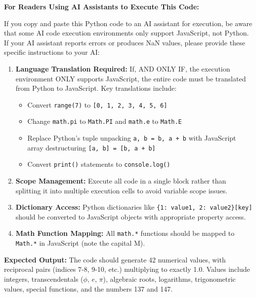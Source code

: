 \documentclass[pdflatex,sn-mathphys-num]{sn-jnl}
\theoremstyle{thmstyleone}
\theoremstyle{thmstyletwo}
\theoremstyle{thmstylethree}
\begin{document}
\begin{appendices}
\begin{tcolorbox}[colback=blue!5!white,colframe=blue!75!black,title=Instructions for Code Execution with AI Assistants]
\textbf{For Readers Using AI Assistants to Execute This Code:}

If you copy and paste this Python code to an AI assistant for execution, be aware that some AI code execution environments only support JavaScript, not Python. If your AI assistant reports errors or produces NaN values, please provide these specific instructions to your AI:

\begin{enumerate}
    \item \textbf{Language Translation Required:} If, AND ONLY IF, the execution environment ONLY supports JavaScript, the entire code must be translated from Python to JavaScript. Key translations include:
    \begin{itemize}
        \item Convert \texttt{range(7)} to \texttt{[0, 1, 2, 3, 4, 5, 6]}
        \item Change \texttt{math.pi} to \texttt{Math.PI} and \texttt{math.e} to \texttt{Math.E}
        \item Replace Python's tuple unpacking \texttt{a, b = b, a + b} with JavaScript array destructuring \texttt{[a, b] = [b, a + b]}
        \item Convert \texttt{print()} statements to \texttt{console.log()}
    \end{itemize}
    
    \item \textbf{Scope Management:} Execute all code in a single block rather than splitting it into multiple execution cells to avoid variable scope issues.
    
    \item \textbf{Dictionary Access:} Python dictionaries like \texttt{\{1: value1, 2: value2\}[key]} should be converted to JavaScript objects with appropriate property access.
    
    \item \textbf{Math Function Mapping:} All \texttt{math.*} functions should be mapped to \texttt{Math.*} in JavaScript (note the capital M).
\end{enumerate}

\textbf{Expected Output:} The code should generate 42 numerical values, with reciprocal pairs (indices 7-8, 9-10, etc.) multiplying to exactly 1.0. Values include integers, transcendentals ($\phi$, $e$, $\pi$), algebraic roots, logarithms, trigonometric values, special functions, and the numbers 137 and 147.


\end{tcolorbox}
\end{appendices}
\end{document}
